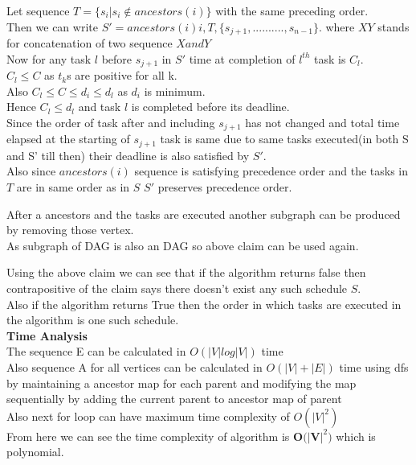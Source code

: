 \documentclass{report}
\begin{document}
 Let sequence $T = \{s_i | s_i \notin ancestors(i) \}$ with the same preceding order.\\
 Then we can write $S' = ancestors(i){i},T,\{s_{j+1}, .......... ,s_{n-1}\}$. where $XY$ stands for concatenation of two sequence $X and Y$\\
 
 Now for any task $l$ before $s_{j+1}$ in $S'$ time at completion of $l^{th}$ task is $C_l$.\\
 $C_l \leq C$ as $t_k$s are positive for all k.\\
 Also $C_l \leq C \leq d_i \leq d_l$ as $d_i$ is minimum.\\
 Hence $C_l \leq d_l$ and task $l$ is completed before its deadline.\\
 Since the order of task after and including ${s_{j+1}}$ has not changed and total time elapsed at the starting of $s_{j+1}$ task is same due to same tasks executed(in both S and S' till then) their deadline is also satisfied by $S'$.\\
 Also since $ancestors(i)$ sequence is satisfying precedence order and the tasks in $T$ are in same order as in $S$ $S'$ preserves precedence order.\\
 \vspace{1em}
 
 After a ancestors and the tasks are executed another subgraph can be produced by removing those vertex.\\
 As subgraph of DAG is also an DAG so above claim can be used again.
 
  Using the above claim we can see that if the algorithm returns false then contrapositive of the claim says there doesn't exist any such schedule $S$.\\
  Also if the algorithm returns True then the order in which tasks are executed in the algorithm is one such schedule.\\

  \textbf{Time Analysis}\\
  The sequence E can be calculated in $O(|V|log|V|)$ time\\
  Also sequence A for all vertices can be calculated in $O(|V|+|E|)$ time using dfs  by maintaining a ancestor map for each parent and modifying the map sequentially by adding the current parent to ancestor map of parent\\
  Also next for loop can have maximum time complexity of $O(|V|^2)$\\
  From here we can see the time complexity of algorithm is \textbf{O$(|$V$|^2)$} which is polynomial.
 
\end{document}
